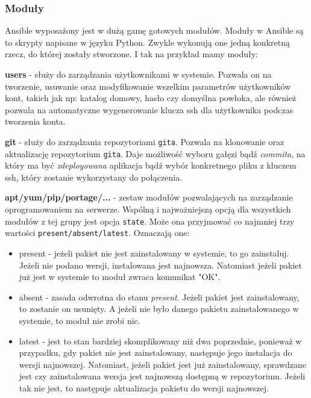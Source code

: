 \subsubsection{Moduły}
Ansible wyposażony jest w dużą gamę gotowych modułów.
Moduły w Ansible są to skrypty napisane w języku Python. Zwykle wykonują one jedną konkretną rzecz, do której zostały stworzone.
I tak na przykład mamy moduły:
\begin{description}
	\item{\textbf{users}} - służy do zarządzania użytkownikami w systemie. Pozwala on na tworzenie, usuwanie oraz modyfikowanie wszelkim parametrów użytkowników kont, takich jak np: katalog domowy, hasło czy domyślna powłoka, ale również pozwala na automatyczne wygenerowanie klucza ssh dla użytkownika podczas tworzenia konta.
	\item{\textbf{git}} - służy do zarządzania repozytoriami \texttt{gita}. Pozwala na klonowanie oraz aktualizację repozytorium \texttt{gita}. Daje możliwość wyboru gałęzi bądź \textit{commita}, na który ma być \textit{zdeployowana} aplikacja bądź wybór konkretnego pliku z kluczem ssh, który zostanie wykorzystany do połączenia.
	\item{\textbf{apt/yum/pip/portage/...}} - zestaw modułów pozwalających na zarządzanie oprogramowaniem na serwerze. Wspólną i najważniejszą opcją dla wszystkich modułów z tej grupy jest opcja \texttt{state}. Może ona przyjmować co najmniej trzy wartości \texttt{present/absent/latest}. Oznaczają one:
		\begin{itemize}
			\item{present} - jeżeli pakiet nie jest zainstalowany w systemie, to go zainstaluj. Jeżeli nie podano wersji, instalowana jest najnowsza.
				Natomiast jeżeli pakiet już jest w systemie to moduł zwraca komunikat "OK".
			\item{absent} - zasada odwrotna do stanu \textit{present}. Jeżeli pakiet jest zainstalowany, to zostanie on usunięty.
				A jeżeli nie było danego pakietu zainstalowanego w systemie, to moduł nie zrobi nic.
			\item{latest} - jest to stan bardziej skomplikowany niż dwa poprzednie, ponieważ w przypadku, gdy pakiet nie jest zainstalowany, następuje jego instalacja do wersji najnowszej.
				Natomiast, jeżeli pakiet jest już zainstalowany, sprawdzane jest czy zainstalowana wersja jest najnowszą dostępną w repozytorium.
				Jeżeli tak nie jest, to następuje aktualizacja pakietu do wersji najnowszej.
				

\end{itemize}
\end{description}
